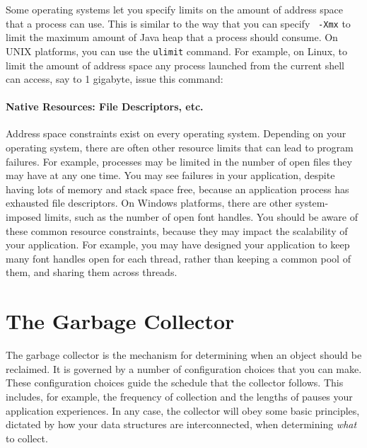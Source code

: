 Some operating systems let you specify limits on the amount of address space
that a process can use. This is similar to the way that you can specify {\tt
-Xmx} to limit the maximum amount of Java heap that a process should consume. On
UNIX platforms, you can use the {\tt ulimit} command. For example, on Linux, to
limit the amount of address space any process launched from the current shell
can access, say to 1 gigabyte, issue this command:
\begin{shortlisting}
\end{shortlisting}

\paragraph{Native Resources: File Descriptors, etc.}
Address space constraints exist on every operating system. Depending on your
operating system, there are often other resource limits that can lead to program
failures. For example, processes may be limited in the number of open files they
may have at any one time. You may see failures in your application, despite
having lots of memory and stack space free, because an application process has
exhausted file descriptors. On Windows platforms, there are other system-imposed
limits, such as the number of open font handles. You should be aware of these
common resource constraints, because they may impact the scalability of your
application. For example, you may have designed your application to keep many
font handles open for each thread, rather than keeping a common pool of them,
and sharing them across threads.

\section{The Garbage Collector}
The garbage collector is the mechanism for determining when an object should be
reclaimed. It is governed by a number of configuration choices that you can make.
These configuration choices guide the schedule that the collector follows. This
includes, for example, the frequency of collection and the lengths of pauses your
application experiences. In any case, the collector will obey some basic
principles, dictated by how your data structures are interconnected, when
determining \emph{what} to collect.


